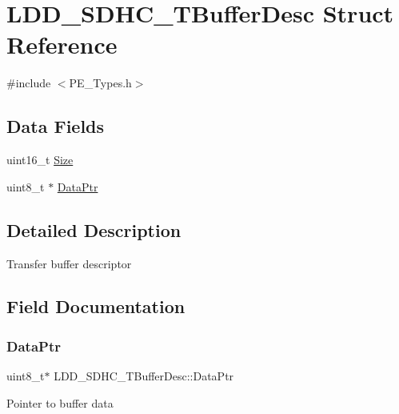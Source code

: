 \hypertarget{struct_l_d_d___s_d_h_c___t_buffer_desc}{}\section{L\+D\+D\+\_\+\+S\+D\+H\+C\+\_\+\+T\+Buffer\+Desc Struct Reference}
\label{struct_l_d_d___s_d_h_c___t_buffer_desc}


{\ttfamily \#include $<$P\+E\+\_\+\+Types.\+h$>$}

\subsection*{Data Fields}
\begin{DoxyCompactItemize}
\item 
uint16\+\_\+t \hyperlink{struct_l_d_d___s_d_h_c___t_buffer_desc_a117f5acff1ada72194a95b38795bca56}{Size}
\item 
uint8\+\_\+t $\ast$ \hyperlink{struct_l_d_d___s_d_h_c___t_buffer_desc_a0349f594a37791792e4a213111173a68}{Data\+Ptr}
\end{DoxyCompactItemize}


\subsection{Detailed Description}
Transfer buffer descriptor 

\subsection{Field Documentation}
\mbox{\label{struct_l_d_d___s_d_h_c___t_buffer_desc_a0349f594a37791792e4a213111173a68}} 
\subsubsection{\texorpdfstring{Data\+Ptr}{DataPtr}}
{\footnotesize\ttfamily uint8\+\_\+t$\ast$ L\+D\+D\+\_\+\+S\+D\+H\+C\+\_\+\+T\+Buffer\+Desc\+::\+Data\+Ptr}

Pointer to buffer data \mbox{\label{struct_l_d_d___s_d_h_c___t_buffer_desc_a117f5acff1ada72194a95b38795bca56}} 
